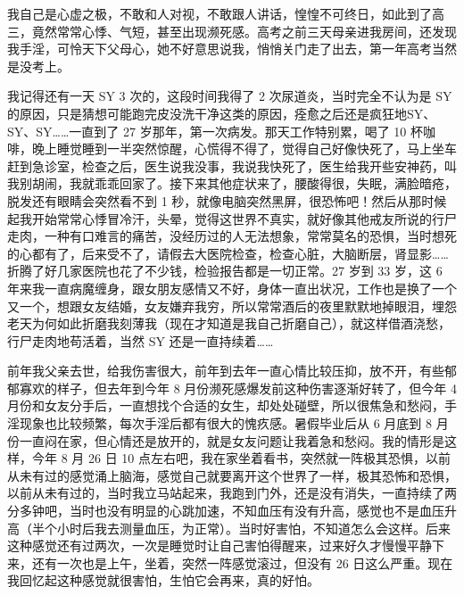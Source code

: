 \begin{case}[濒死感]
    我自己是心虚之极，不敢和人对视，不敢跟人讲话，惶惶不可终日，如此到了高三，竟然常常心悸、气短，甚至出现濒死感。高考之前三天母亲进我房间，还发现我手淫，可怜天下父母心，她不好意思说我，悄悄关门走了出去，第一年高考当然是没考上。
\end{case}

\begin{case}[濒死感]
    我记得还有一天 SY 3 次的，这段时间我得了 2 次尿道炎，当时完全不认为是 SY 的原因，只是猜想可能跑完皮没洗干净这类的原因，痊愈之后还是疯狂地SY、SY、SY……一直到了 27 岁那年，第一次病发。那天工作特别累，喝了 10 杯咖啡，晚上睡觉睡到一半突然惊醒，心慌得不得了，觉得自己好像快死了，马上坐车赶到急诊室，检查之后，医生说我没事，我说我快死了，医生给我开些安神药，叫我别胡闹，我就乖乖回家了。接下来其他症状来了，腰酸得很，失眠，满脸暗疮，脱发还有眼睛会突然看不到 1 秒，就像电脑突然黑屏，很恐怖吧！然后从那时候起我开始常常心悸冒冷汗，头晕，觉得这世界不真实，就好像其他戒友所说的行尸走肉，一种有口难言的痛苦，没经历过的人无法想象，常常莫名的恐惧，当时想死的心都有了，后来受不了，请假去大医院检查，检查心脏，大脑断层，肾显影……折腾了好几家医院也花了不少钱，检验报告都是一切正常。27 岁到 33 岁，这 6 年来我一直病魔缠身，跟女朋友感情又不好，身体一直出状况，工作也是换了一个又一个，想跟女友结婚，女友嫌弃我穷，所以常常酒后的夜里默默地掉眼泪，埋怨老天为何如此折磨我刻薄我（现在才知道是我自己折磨自己），就这样借酒浇愁，行尸走肉地苟活着，当然 SY 还是一直持续着……
\end{case}

\begin{case}[濒死感]
    前年我父亲去世，给我伤害很大，前年到去年一直心情比较压抑，放不开，有些郁郁寡欢的样子，但去年到今年 8 月份濒死感爆发前这种伤害逐渐好转了，但今年 4 月份和女友分手后，一直想找个合适的女生，却处处碰壁，所以很焦急和愁闷，手淫现象也比较频繁，每次手淫后都有很大的愧疚感。暑假毕业后从 6 月底到 8 月份一直闷在家，但心情还是放开的，就是女友问题让我着急和愁闷。我的情形是这样，今年 8 月 26 日 10 点左右吧，我在家坐着看书，突然就一阵极其恐惧，以前从未有过的感觉涌上脑海，感觉自己就要离开这个世界了一样，极其恐怖和恐惧，以前从未有过的，当时我立马站起来，我跑到门外，还是没有消失，一直持续了两分多钟吧，当时也没有明显的心跳加速，不知血压有没有升高，感觉也不是血压升高（半个小时后我去测量血压，为正常）。当时好害怕，不知道怎么会这样。后来这种感觉还有过两次，一次是睡觉时让自己害怕得醒来，过来好久才慢慢平静下来，还有一次也是上午，坐着，突然一阵感觉滚过，但没有 26 日这么严重。现在我回忆起这种感觉就很害怕，生怕它会再来，真的好怕。
\end{case}

